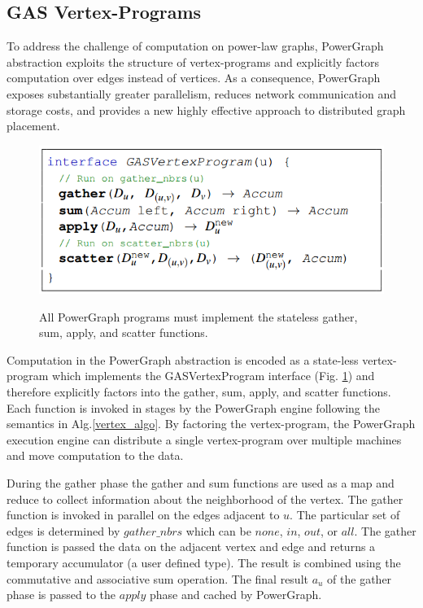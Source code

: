 \documentclass {article}
\begin{document}
\subsection{GAS Vertex-Programs}
To address the challenge of computation on power-law graphs, 
PowerGraph abstraction exploits the structure of vertex-programs
and explicitly factors computation over edges instead of vertices.
As a consequence, PowerGraph exposes substantially greater parallelism,
reduces network communication and storage costs, and provides a new
highly effective approach to distributed graph placement.

\begin{figure}
  \centering
  \includegraphics[width=\textwidth]{GAS.png}\\
  \caption{All PowerGraph programs must implement the stateless 
  gather, sum, apply, and scatter functions.}\label{GAS_inter}
\end{figure}


Computation in the PowerGraph abstraction is encoded
as a state-less vertex-program which implements the
GASVertexProgram interface (Fig. \ref{GAS_inter}) and therefore
explicitly factors into the gather, sum, apply, and scatter functions. 
Each function is invoked in stages by the PowerGraph engine following 
the semantics in Alg.\ref{vertex_algo}. By factoring the vertex-program,
the PowerGraph execution engine can distribute a single vertex-program over
multiple machines and move computation to the data.


During the gather phase the gather and sum functions are used as a map and
reduce to collect information about the neighborhood of the vertex.
The gather function is invoked in parallel on the edges adjacent to $u$. The
particular set of edges is determined by $gather\_nbrs$ which can be $none$, 
$in$, $out$, or $all$. The gather function is passed the data on the adjacent
vertex and edge and returns a temporary accumulator (a user defined type).
The result is combined using the commutative and associative sum operation.
The final result $a_u$ of the gather phase is passed to the $apply$ phase and
cached by PowerGraph.
\end{document}
